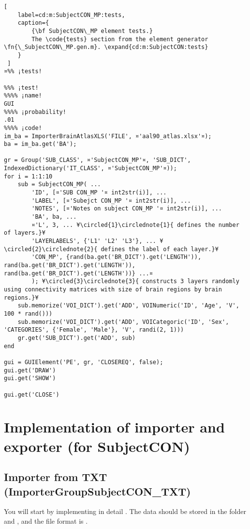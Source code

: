\documentclass{tufte-handout}
\begin{document}
\begin{lstlisting}[
	label=cd:m:SubjectCON_MP:tests,
	caption={
		{\bf SubjectCON\_MP element tests.}
		The \code{tests} section from the element generator \fn{\_SubjectCON\_MP.gen.m}. \expand{cd:m:SubjectCON:tests}
	}
 ]
¤%% ¡tests!

%%% ¡test!
%%%% ¡name!
GUI
%%%% ¡probability!
.01
%%%% ¡code!
im_ba = ImporterBrainAtlasXLS('FILE', ¤'aal90_atlas.xlsx'¤);
ba = im_ba.get('BA');

gr = Group('SUB_CLASS', ¤'SubjectCON_MP'¤, 'SUB_DICT', IndexedDictionary('IT_CLASS', ¤'SubjectCON_MP'¤));
for i = 1:1:10 
    sub = SubjectCON_MP( ...
        'ID', [¤'SUB CON_MP '¤ int2str(i)], ...
        'LABEL', [¤'Subejct CON_MP '¤ int2str(i)], ...
        'NOTES', [¤'Notes on subject CON_MP '¤ int2str(i)], ...
        'BA', ba, ...
        ¤'L', 3, ... ¥\circled{1}\circlednote{1}{ defines the number of layers.}¥
        'LAYERLABELS', {'L1' 'L2' 'L3'}, ... ¥\circled{2}\circlednote{2}{ defines the label of each layer.}¥
        'CON_MP', {rand(ba.get('BR_DICT').get('LENGTH')), rand(ba.get('BR_DICT').get('LENGTH')), rand(ba.get('BR_DICT').get('LENGTH'))} ...¤
        ); ¥\circled{3}\circlednote{3}{ constructs 3 layers randomly using connectivity matrices with size of brain regions by brain regions.}¥
    sub.memorize('VOI_DICT').get('ADD', VOINumeric('ID', 'Age', 'V', 100 * rand()))
    sub.memorize('VOI_DICT').get('ADD', VOICategoric('ID', 'Sex', 'CATEGORIES', {'Female', 'Male'}, 'V', randi(2, 1)))
    gr.get('SUB_DICT').get('ADD', sub)
end

gui = GUIElement('PE', gr, 'CLOSEREQ', false);
gui.get('DRAW')
gui.get('SHOW')

gui.get('CLOSE')
\end{lstlisting}

\clearpage

\section{Implementation of importer and exporter (for SubjectCON)}

\subsection{Importer from TXT (ImporterGroupSubjectCON\_TXT)}

You will start by implementing in detail . The data should be stored in the folder  and , and the file format is .
\end{document}
